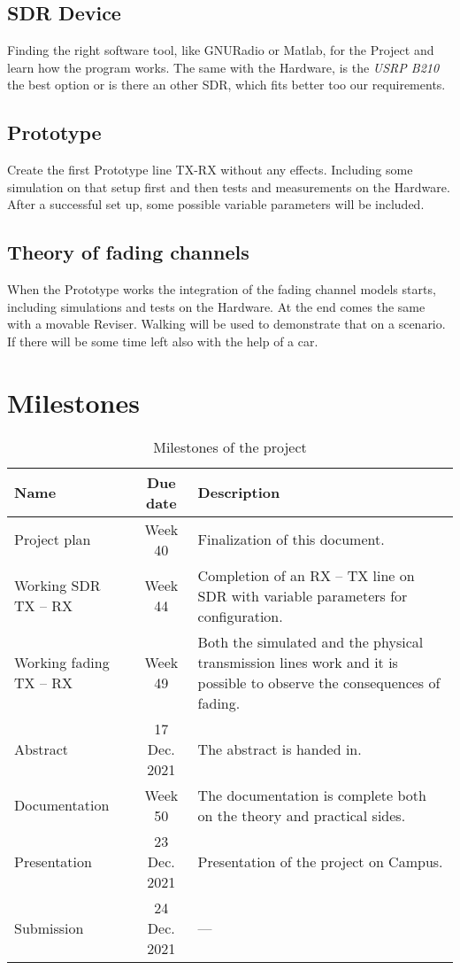 \documentclass[a4paper, twosided, 11pt]{scrartcl}
\begin{document}
\subsection{SDR Device}
Finding the right software tool, like GNURadio or Matlab, for the Project and learn how the program works. The same with the Hardware, is the \textit{USRP B210} the best option or is there an other SDR, which fits better too our requirements. 

\subsection{Prototype}
Create the first Prototype line TX-RX without any effects. Including some simulation on that setup first and then tests and measurements on the Hardware. 
After a successful set up, some possible variable parameters will be included. 

\subsection{Theory of fading channels}
When the Prototype works the integration of the fading channel models starts, including simulations and tests on the Hardware. 
At the end comes the same with a movable Reviser. Walking will be used to demonstrate that on a scenario. If there will be some time left also with the help of a car.

\newpage
\section{Milestones}

\begin{table}[h]
	\centering
	\caption{Milestones of the project}
	\renewcommand\arraystretch{1.2}
	\begin{tabularx}{\linewidth}{l c X}
		\toprule
		\bfseries Name & \bfseries Due date & \bfseries Description \\
		\midrule
		Project plan & Week 40 & 
			Finalization of this document. \\

		Working SDR TX -- RX  & Week 44 &
			Completion of an RX -- TX line on SDR with variable parameters for configuration. \\

		Working fading TX -- RX & Week 49 &
			Both the simulated and the physical transmission lines work and it is possible to observe the consequences of fading.\\
			
		Abstract & 17 Dec. 2021 &
			The abstract is handed in. \\

		Documentation & Week 50 &
			The documentation is complete both on the theory and practical sides. \\

		Presentation & 23 Dec. 2021 &
			Presentation of the project on Campus. \\
		Submission & 24 Dec. 2021 & --- \\
		\bottomrule
	\end{tabularx}
\end{table}
\end{document}
